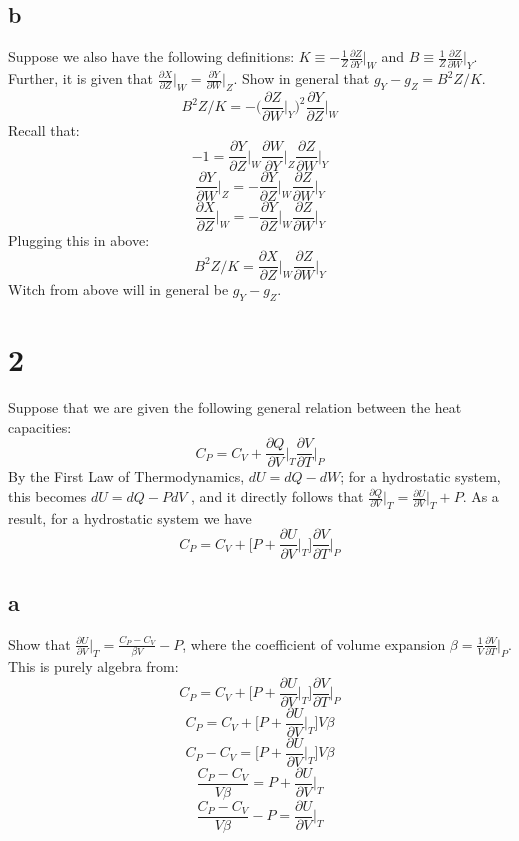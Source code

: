 \documentclass[10pt,a4paper]{article}
\begin{document}
\subsection{b}
Suppose we also have the following definitions: $K\equiv -\frac{1}{Z}\frac{\partial Z}{\partial Y}\biggr |_W$ and $B\equiv \frac{1}{Z}\frac{\partial Z}{\partial W}\biggr |_Y$.  Further, it is given that $\frac{\partial X}{\partial Z}\biggr |_W=\frac{\partial Y}{\partial W}\biggr |_Z$. Show in general that $g_Y-g_Z=B^2Z/K$.\\

$$B^2Z/K=-\biggr (\frac{\partial Z}{\partial W}\biggr |_Y \biggr )^2 \frac{\partial Y}{\partial Z}\biggr |_W$$
Recall that:
$$-1=\frac{\partial Y}{\partial Z}\biggr |_W \frac{\partial W}{\partial Y}\biggr |_Z \frac{\partial Z}{\partial W}\biggr |_Y$$
$$\frac{\partial Y}{\partial W}\biggr |_Z=-\frac{\partial Y}{\partial Z}\biggr |_W \frac{\partial Z}{\partial W}\biggr |_Y$$
$$\frac{\partial X}{\partial Z}\biggr |_W=-\frac{\partial Y}{\partial Z}\biggr |_W \frac{\partial Z}{\partial W}\biggr |_Y$$
Plugging this in above:
$$B^2Z/K=\frac{\partial X}{\partial Z}\biggr |_W \frac{\partial Z}{\partial W}\biggr |_Y$$
Witch from above will in general be $g_Y-g_Z$.
\section{2}

Suppose that we are given the following general relation between the heat capacities:
$$C_P=C_V+\frac{\partial Q}{\partial V}\biggr |_T \frac{\partial V}{\partial T}\biggr |_P$$
By the First Law of Thermodynamics, $dU = dQ - dW$; for a hydrostatic system, this becomes $dU = dQ - P dV$ , and it directly follows that $\frac{\partial Q}{\partial V}\biggr |_T=\frac{\partial U}{\partial V}\biggr |_T+P$. As a
result, for a hydrostatic system we have
$$C_P=C_V+\biggr [P+\frac{\partial U}{\partial V}\biggr |_T\biggr ] \frac{\partial V}{\partial T}\biggr |_P$$
\subsection{a}
Show that $\frac{\partial U}{\partial V}\biggr |_T=\frac{C_P-C_V}{\beta V}-P$, where the coefficient of volume expansion $\beta=\frac{1}{V}\frac{\partial V}{\partial T}\biggr |_P$.\\

This is purely algebra from:
$$C_P=C_V+\biggr [P+\frac{\partial U}{\partial V}\biggr |_T\biggr ] \frac{\partial V}{\partial T}\biggr |_P$$
$$C_P=C_V+\biggr [P+\frac{\partial U}{\partial V}\biggr |_T\biggr ] V\beta$$
$$C_P-C_V=\biggr [P+\frac{\partial U}{\partial V}\biggr |_T\biggr ] V\beta$$
$$\frac{C_P-C_V}{V\beta}=P+\frac{\partial U}{\partial V}\biggr |_T $$
$$\frac{C_P-C_V}{V\beta}-P=\frac{\partial U}{\partial V}\biggr |_T $$
\end{document}
